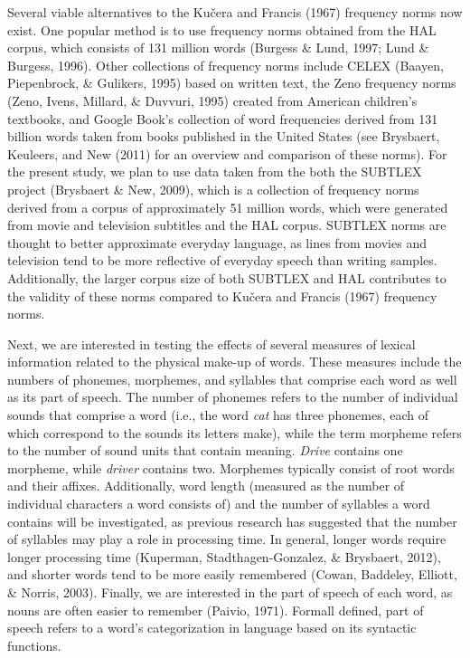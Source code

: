 \documentclass[english,man]{apa6}
\theoremstyle{definition}
\theoremstyle{definition}
\theoremstyle{definition}
\theoremstyle{remark}
\begin{document}
Several viable alternatives to the Kučera and Francis (1967) frequency
norms now exist. One popular method is to use frequency norms obtained
from the HAL corpus, which consists of 131 million words (Burgess \&
Lund, 1997; Lund \& Burgess, 1996). Other collections of frequency norms
include CELEX (Baayen, Piepenbrock, \& Gulikers, 1995) based on written
text, the Zeno frequency norms (Zeno, Ivens, Millard, \& Duvvuri, 1995)
created from American children's textbooks, and Google Book's collection
of word frequencies derived from 131 billion words taken from books
published in the United States (see Brysbaert, Keuleers, and New (2011)
for an overview and comparison of these norms). For the present study,
we plan to use data taken from the both the SUBTLEX project (Brysbaert
\& New, 2009), which is a collection of frequency norms derived from a
corpus of approximately 51 million words, which were generated from
movie and television subtitles and the HAL corpus. SUBTLEX norms are
thought to better approximate everyday language, as lines from movies
and television tend to be more reflective of everyday speech than
writing samples. Additionally, the larger corpus size of both SUBTLEX
and HAL contributes to the validity of these norms compared to Kučera
and Francis (1967) frequency norms.

Next, we are interested in testing the effects of several measures of
lexical information related to the physical make-up of words. These
measures include the numbers of phonemes, morphemes, and syllables that
comprise each word as well as its part of speech. The number of phonemes
refers to the number of individual sounds that comprise a word (i.e.,
the word \emph{cat} has three phonemes, each of which correspond to the
sounds its letters make), while the term morpheme refers to the number
of sound units that contain meaning. \emph{Drive} contains one morpheme,
while \emph{driver} contains two. Morphemes typically consist of root
words and their affixes. Additionally, word length (measured as the
number of individual characters a word consists of) and the number of
syllables a word contains will be investigated, as previous research has
suggested that the number of syllables may play a role in processing
time. In general, longer words require longer processing time (Kuperman,
Stadthagen-Gonzalez, \& Brysbaert, 2012), and shorter words tend to be
more easily remembered (Cowan, Baddeley, Elliott, \& Norris, 2003).
Finally, we are interested in the part of speech of each word, as nouns
are often easier to remember (Paivio, 1971). Formall defined, part of
speech refers to a word's categorization in language based on its
syntactic functions.
\end{document}
